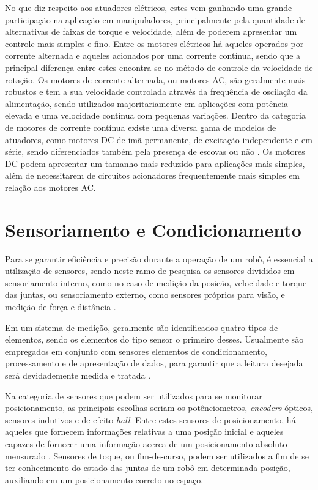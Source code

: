 No que diz respeito aos atuadores elétricos, estes vem ganhando uma grande participação na aplicação em manipuladores, principalmente pela quantidade de 
alternativas de faixas de torque e velocidade, além de poderem apresentar um controle mais simples e fino. Entre os motores elétricos há aqueles operados
por corrente alternada e aqueles acionados por uma corrente contínua, sendo que a principal diferença entre estes encontra-se no método de controle
da velocidade de rotação. Os motores de corrente alternada, ou motores AC, são geralmente mais robustos e tem a sua velocidade controlada através da frequência
de oscilação da alimentação, sendo utilizados majoritariamente em aplicações com potência elevada e uma velocidade contínua com pequenas variações. Dentro da categoria de motores de corrente contínua existe uma diversa gama de modelos de atuadores, 
como motores DC de imã permanente, de excitação independente e em série, sendo diferenciados também pela presença de escovas ou não \cite{chapman2005electric}. 
Os motores DC podem apresentar um tamanho mais reduzido para aplicações mais simples, além de necessitarem de circuitos acionadores frequentemente mais simples em 
relação aos motores AC.

\section{Sensoriamento e Condicionamento}
Para se garantir eficiência e precisão durante a operação de um robô, é essencial a utilização de sensores, sendo neste ramo de pesquisa os sensores
divididos em sensoriamento interno, como no caso de medição da posicão, velocidade e torque das juntas, ou sensoriamento externo, como sensores próprios para 
visão, e medição de força e distância \cite{bajd2010robotics}.

Em um sistema de medição, geralmente são identificados quatro tipos de elementos, sendo os elementos do tipo sensor o primeiro desses. Usualmente são empregados
em conjunto com sensores elementos de condicionamento, processamento e de apresentação de dados, para garantir que a leitura desejada será devidademente medida
e tratada \cite{bentley2005principles}.

Na categoria de sensores que podem ser utilizados para se monitorar posicionamento, as principais escolhas seriam os potênciometros, \textit{encoders} ópticos, 
sensores indutivos e de efeito \textit{hall}. Entre estes sensores de posicionamento, há aqueles que fornecem informações relativas a uma posição inicial e aqueles
capazes de fornecer uma informação acerca de um posicionamento absoluto mensurado \cite{bentley2005principles}. Sensores de toque, ou fim-de-curso, podem ser utilizados
a fim de se ter conhecimento do estado das juntas de um robô em determinada posição, auxiliando em um posicionamento correto no espaço.

